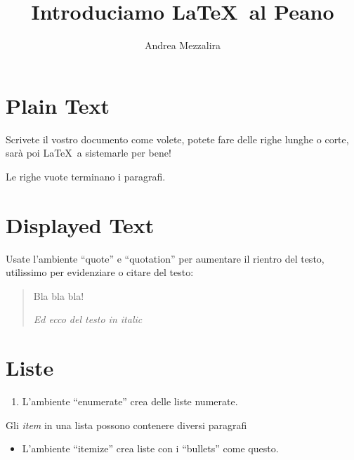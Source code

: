 \documentclass[a4paper,11pt]{article}
\begin{document}
\title{Introduciamo \LaTeX\  al Peano}
\author{Andrea Mezzalira}
\renewcommand{\today}{23 Ottobre 2017}

\maketitle

\begin{abstract}
    \lipsum[1]
\end{abstract}

\tableofcontents


\section{Plain Text}
Scrivete il vostro documento come volete, potete
fare delle righe lunghe o corte, sarà poi \LaTeX\  a sistemarle
per bene!

Le righe vuote terminano i paragrafi.


\section{Displayed Text}
Usate l'ambiente ``quote'' e ``quotation'' per aumentare il rientro del testo, utilissimo per evidenziare o citare del testo:

\begin{quotation}
Bla bla bla!

\em Ed ecco del testo in italic

\end{quotation}





\section{Liste}

\begin{enumerate}
\item 
L'ambiente ``enumerate'' crea delle liste numerate.
\end{enumerate}


Gli {\em item} in una lista possono contenere diversi paragrafi 

\begin{itemize}
  \item L'ambiente ``itemize'' crea liste con i  ``bullets'' come questo.
\end{itemize}
\end{document}
